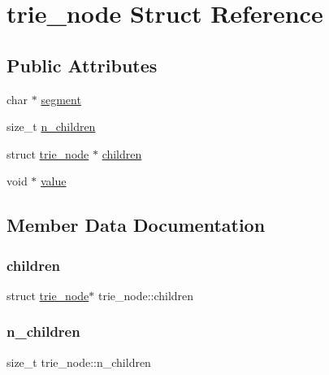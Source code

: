 \hypertarget{structtrie__node}{}\section{trie\+\_\+node Struct Reference}
\label{structtrie__node}
\subsection*{Public Attributes}
\begin{DoxyCompactItemize}
\item 
char $\ast$ \mbox{\hyperlink{structtrie__node_a12084a8e8f390a22ed508767066eba93}{segment}}
\item 
size\+\_\+t \mbox{\hyperlink{structtrie__node_acd63f818f932e0092f463360c7895e6e}{n\+\_\+children}}
\item 
struct \mbox{\hyperlink{structtrie__node}{trie\+\_\+node}} $\ast$ \mbox{\hyperlink{structtrie__node_a1166d2a6b60aa52e784572d5ed1da336}{children}}
\item 
void $\ast$ \mbox{\hyperlink{structtrie__node_a7915ff25676c2c37fe54a7b3055cca6a}{value}}
\end{DoxyCompactItemize}


\subsection{Member Data Documentation}
\mbox{\label{structtrie__node_a1166d2a6b60aa52e784572d5ed1da336}} 
\subsubsection{\texorpdfstring{children}{children}}
{\footnotesize\ttfamily struct \mbox{\hyperlink{structtrie__node}{trie\+\_\+node}}$\ast$ trie\+\_\+node\+::children}

\mbox{\label{structtrie__node_acd63f818f932e0092f463360c7895e6e}} 
\subsubsection{\texorpdfstring{n\_children}{n\_children}}
{\footnotesize\ttfamily size\+\_\+t trie\+\_\+node\+::n\+\_\+children}


